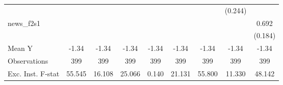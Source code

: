 {\begin{tabular}{l*{8}{c}}
            &                     &                     &                     &                     &                     &                     &     (0.244)         &                     \\
\addlinespace
news\_f2s1   &                     &                     &                     &                     &                     &                     &                     &       0.692\sym{***}\\
            &                     &                     &                     &                     &                     &                     &                     &     (0.184)         \\
\midrule
Mean Y      &       -1.34         &       -1.34         &       -1.34         &       -1.34         &       -1.34         &       -1.34         &       -1.34         &       -1.34         \\
Observations&         399         &         399         &         399         &         399         &         399         &         399         &         399         &         399         \\
Exc. Inst. F-stat&      55.545         &      16.108         &      25.066         &       0.140         &      21.131         &      55.800         &      11.330         &      48.142         \\
\bottomrule
\end{tabular}
}

